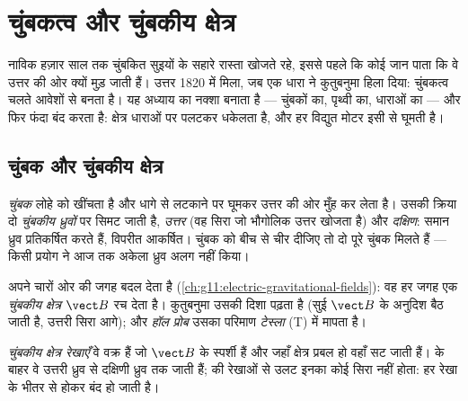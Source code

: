 \chapter{चुंबकत्व और चुंबकीय क्षेत्र}\label{ch:g11:magnetic-fields}

नाविक हज़ार साल तक चुंबकित सुइयों के सहारे रास्ता खोजते रहे, इससे पहले कि
कोई जान पाता कि वे उत्तर की ओर क्यों मुड़ जाती हैं। उत्तर 1820 में मिला, जब
एक धारा ने कुतुबनुमा हिला दिया: चुंबकत्व चलते आवेशों से बनता है। यह अध्याय
 का नक्शा बनाता है --- चुंबकों का, पृथ्वी का,
धाराओं का --- और फिर फंदा बंद करता है: क्षेत्र धाराओं पर पलटकर
धकेलता है, और हर विद्युत मोटर इसी से घूमती है।

\section{चुंबक और चुंबकीय क्षेत्र}

\begin{definition}[चुंबक और ध्रुव]\label{def:g11:magnetic-fields:magnet}
\emph{चुंबक} लोहे को खींचता है और धागे से लटकाने पर घूमकर उत्तर
की ओर मुँह कर लेता है। उसकी क्रिया दो \emph{चुंबकीय ध्रुवों} पर सिमट जाती है, \emph{उत्तर} (वह सिरा जो भौगोलिक उत्तर खोजता है) और
\emph{दक्षिण}: समान ध्रुव प्रतिकर्षित करते हैं, विपरीत आकर्षित। चुंबक को बीच
से चीर दीजिए तो दो पूरे चुंबक मिलते हैं --- किसी प्रयोग ने आज तक अकेला ध्रुव
अलग नहीं किया।
\end{definition}

\begin{definition}[चुंबकीय क्षेत्र]\label{def:g11:magnetic-fields:bfield}
 अपने चारों ओर की जगह बदल देता है (\cref{ch:g11:electric-gravitational-fields}): वह हर जगह एक
\emph{चुंबकीय क्षेत्र} $\vect B$ रच देता है। कुतुबनुमा
उसकी दिशा पढ़ता है (सुई $\vect B$ के अनुदिश बैठ जाती है, उत्तरी सिरा आगे); और
\emph{हॉल प्रोब} उसका परिमाण \emph{टेस्ला}
(\unit{T}) में मापता है।
\end{definition}

\begin{definition}[चुंबकीय क्षेत्र रेखाएँ]\label{def:g11:magnetic-fields:lines}
\emph{चुंबकीय क्षेत्र रेखाएँ} वे वक्र हैं जो
$\vect B$ के स्पर्शी हैं और जहाँ क्षेत्र प्रबल हो वहाँ सट जाती हैं।
 के बाहर वे उत्तरी ध्रुव से दक्षिणी ध्रुव तक जाती हैं;
 की रेखाओं से उलट इनका कोई सिरा नहीं होता: हर रेखा
 के भीतर से होकर बंद हो जाती है।
\end{definition}

